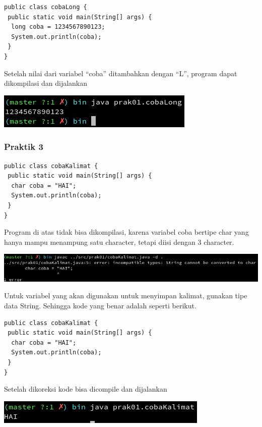 \documentclass[a4paper,12pt]{article}
\begin{document}
\begin{lstlisting}
public class cobaLong {
 public static void main(String[] args) {
  long coba = 1234567890123;
  System.out.println(coba);
 }
}
\end{lstlisting}
Setelah nilai dari variabel ``coba'' ditambahkan dengan ``L'', program dapat
dikompilasi dan dijalankan

\begin{center}
    \includegraphics[scale=1]{3.png}
\end{center}

\subsubsection{Praktik 3}
\begin{lstlisting}
public class cobaKalimat {
 public static void main(String[] args) {
  char coba = "HAI";
  System.out.println(coba);
 }
} 
\end{lstlisting}

Program di atas tidak bisa dikompilasi, karena variabel coba bertipe char
yang hanya mampu menampung satu character, tetapi
diisi dengan 3 character.

\begin{center}
    \includegraphics[width=\textwidth]{4.png}
\end{center}

Untuk variabel yang akan digunakan 
untuk menyimpan kalimat, gunakan tipe data String.
Sehingga kode yang benar adalah seperti berikut.

\begin{lstlisting}
public class cobaKalimat {
 public static void main(String[] args) {
  char coba = "HAI";
  System.out.println(coba);
 }
} 
\end{lstlisting}

Setelah dikoreksi kode bisa dicompile dan dijalankan

\begin{center}
    \includegraphics[width=\textwidth]{5.png} 
\end{center}
\newpage
\end{document}
